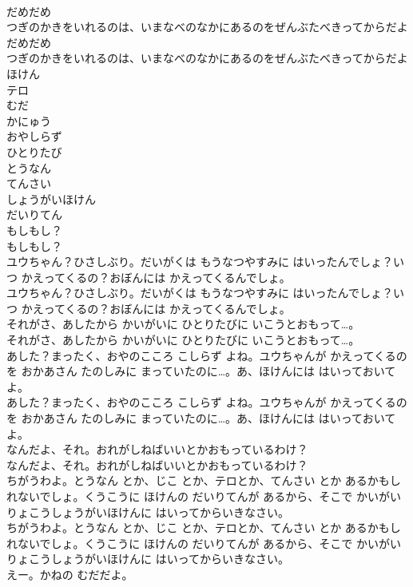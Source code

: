 \documentclass[8pt]{extreport}
\begin{document}
\begin{CJK}{UTF8}{min}
\\	だめだめ
\\	つぎのかきをいれるのは、いまなべのなかにあるのをぜんぶたべきってからだよ
\\	だめだめ
\\	つぎのかきをいれるのは、いまなべのなかにあるのをぜんぶたべきってからだよ
\\	ほけん
\\	テロ
\\	むだ
\\	かにゅう
\\	おやしらず
\\	ひとりたび
\\	とうなん
\\	てんさい
\\	しょうがいほけん
\\	だいりてん
\\	もしもし？
\\	もしもし？
\\	ユウちゃん？ひさしぶり。だいがくは もうなつやすみに はいったんでしょ？いつ かえってくるの？おぼんには かえってくるんでしょ。
\\	ユウちゃん？ひさしぶり。だいがくは もうなつやすみに はいったんでしょ？いつ かえってくるの？おぼんには かえってくるんでしょ。
\\	それがさ、あしたから かいがいに ひとりたびに いこうとおもって…。
\\	それがさ、あしたから かいがいに ひとりたびに いこうとおもって…。
\\	あした？まったく、おやのこころ こしらず よね。ユウちゃんが かえってくるのを おかあさん たのしみに まっていたのに…。あ、ほけんには はいっておいてよ。
\\	あした？まったく、おやのこころ こしらず よね。ユウちゃんが かえってくるのを おかあさん たのしみに まっていたのに…。あ、ほけんには はいっておいてよ。
\\	なんだよ、それ。おれがしねばいいとかおもっているわけ？
\\	なんだよ、それ。おれがしねばいいとかおもっているわけ？
\\	ちがうわよ。とうなん とか、じこ とか、テロとか、てんさい とか あるかもしれないでしょ。くうこうに ほけんの だいりてんが あるから、そこで かいがいりょこうしょうがいほけんに はいってからいきなさい。
\\	ちがうわよ。とうなん とか、じこ とか、テロとか、てんさい とか あるかもしれないでしょ。くうこうに ほけんの だいりてんが あるから、そこで かいがいりょこうしょうがいほけんに はいってからいきなさい。
\\	えー。かねの むだだよ。

\end{CJK}
\end{document}
